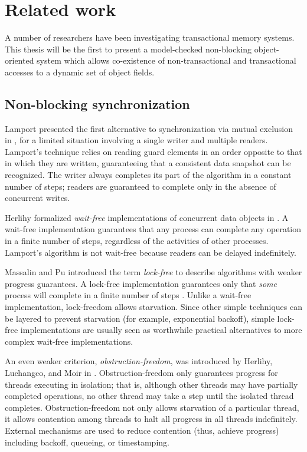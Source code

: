 \documentclass[12pt,twoside]{article}
\newcommand{\secput}[2]{\section{#2}\label{sec:#1}}
\newcommand{\subsecput}[2]{\subsection{#2}\label{sec:#1}}
\begin{document}
\secput{related}{Related work}
A number of researchers have been investigating transactional memory
systems.  This thesis will be the first to present a model-checked non-blocking
object-oriented system which allows co-existence of non-transactional and
transactional accesses to a dynamic set of object fields.

\subsecput{nb-sync}{Non-blocking synchronization}

Lamport presented the first alternative to synchronization via mutual
exclusion in \cite{Lamport77}, for a limited situation involving a single
writer and multiple readers.  Lamport's technique relies on reading
guard elements in an order opposite to that in which they are written,
guaranteeing that a consistent data snapshot can be recognized.  The
writer always completes its part of the algorithm in a constant number
of steps; readers are guaranteed to complete only in the absence of
concurrent writes.

Herlihy formalized \emph{wait-free} implementations of
concurrent data objects in \cite{Herlihy88}.  A wait-free implementation
guarantees that any process can complete any operation in a finite
number of steps, regardless of the activities of other processes.
Lamport's algorithm is not wait-free
because readers can be delayed indefinitely.

Massalin and Pu introduced the term \emph{lock-free} to describe 
algorithms with weaker progress guarantees.
A lock-free implementation guarantees only that \emph{some}
process will complete in a finite number of steps
\cite{MassalinPu91}.  Unlike a wait-free implementation,
lock-freedom allows starvation.  Since other simple techniques can be
layered to prevent starvation (for example, exponential backoff),
simple lock-free implementations are usually seen as worthwhile practical
alternatives to more complex wait-free implementations.

An even weaker criterion, \emph{obstruction-freedom}, was introduced
by Herlihy, Luchangco, and Moir in \cite{HerlihyLuMo03}.
Obstruction-freedom only guarantees progress for threads executing in
isolation; that is, although other threads may have partially
completed operations, no other thread may take a step until the
isolated thread completes.  Obstruction-freedom not only allows
starvation of a particular thread, it allows contention among threads
to halt all progress in all threads
indefinitely.  External mechanisms are used to reduce contention
(thus, achieve progress) including backoff, queueing, or timestamping.
\end{document}
